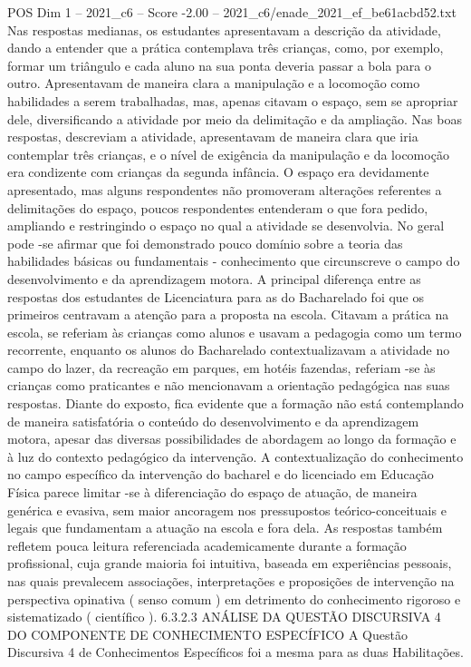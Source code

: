 \begin{textsample}{POS Dim 1 – 2021\_c6 – Score -2.00 – 2021\_c6/enade\_2021\_ef\_be61acbd52.txt}
Nas respostas medianas, os estudantes apresentavam a descrição da atividade, dando a entender que a prática contemplava três crianças, como, por exemplo, formar um triângulo e cada aluno na sua ponta deveria passar a bola para o outro.
Apresentavam de maneira clara a manipulação e a locomoção como habilidades a serem trabalhadas, mas, apenas citavam o espaço, sem se apropriar dele, diversificando a atividade por meio da delimitação e da ampliação.
Nas boas respostas, descreviam a atividade, apresentavam de maneira clara que iria contemplar três crianças, e o nível de exigência da manipulação e da locomoção era condizente com crianças da segunda infância.
O espaço era devidamente apresentado, mas alguns respondentes não promoveram alterações referentes a delimitações do espaço, poucos respondentes entenderam o que fora pedido, ampliando e restringindo o espaço no qual a atividade se desenvolvia.
No geral pode -se afirmar que foi demonstrado pouco domínio sobre a teoria das habilidades básicas ou fundamentais - conhecimento que circunscreve o campo do desenvolvimento e da aprendizagem motora.
A principal diferença entre as respostas dos estudantes de Licenciatura para as do Bacharelado foi que os primeiros centravam a atenção para a proposta na escola.
Citavam a prática na escola, se referiam às crianças como alunos e usavam a pedagogia como um termo recorrente, enquanto os alunos do Bacharelado contextualizavam a atividade no campo do lazer, da recreação em parques, em hotéis fazendas, referiam -se às crianças como praticantes e não mencionavam a orientação pedagógica nas suas respostas.
Diante do exposto, fica evidente que a formação não está contemplando de maneira satisfatória o conteúdo do desenvolvimento e da aprendizagem motora, apesar das diversas possibilidades de abordagem ao longo da formação e à luz do contexto pedagógico da intervenção.
A contextualização do conhecimento no campo específico da intervenção do bacharel e do licenciado em Educação Física parece limitar -se à diferenciação do espaço de atuação, de maneira genérica e evasiva, sem maior ancoragem nos pressupostos teórico-conceituais e legais que fundamentam a atuação na escola e fora dela.
As respostas também refletem pouca leitura referenciada academicamente durante a formação profissional, cuja grande maioria foi intuitiva, baseada em experiências pessoais, nas quais prevalecem associações, interpretações e proposições de intervenção na perspectiva opinativa ( senso comum ) em detrimento do conhecimento rigoroso e sistematizado ( científico ). 6.3.2.3 ANÁLISE DA QUESTÃO DISCURSIVA 4 DO COMPONENTE DE CONHECIMENTO ESPECÍFICO A Questão Discursiva 4 de Conhecimentos Específicos foi a mesma para as duas Habilitações.

\end{textsample}
